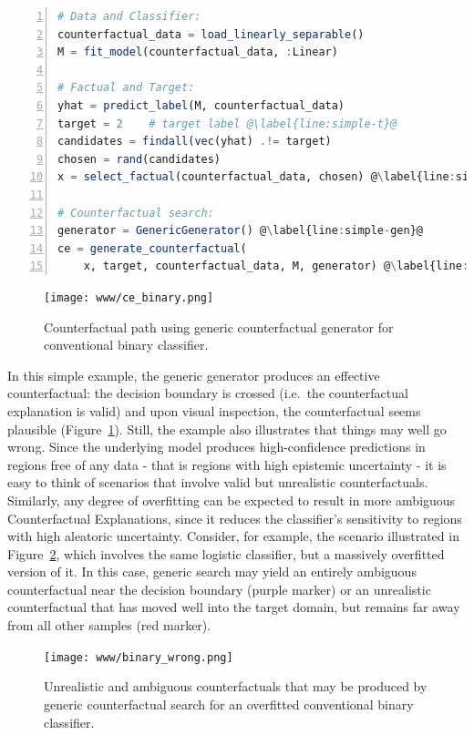 \documentclass{juliacon}
\begin{document}
\begin{lstlisting}[language=Julia, escapechar=@, numbers=left, label={lst:simple}, caption={}] 
# Data and Classifier:
counterfactual_data = load_linearly_separable()
M = fit_model(counterfactual_data, :Linear)

# Factual and Target:
yhat = predict_label(M, counterfactual_data)
target = 2    # target label @\label{line:simple-t}@
candidates = findall(vec(yhat) .!= target)
chosen = rand(candidates)
x = select_factual(counterfactual_data, chosen) @\label{line:simple-x}@

# Counterfactual search:
generator = GenericGenerator() @\label{line:simple-gen}@
ce = generate_counterfactual(
    x, target, counterfactual_data, M, generator) @\label{line:simple-search}@
\end{lstlisting}

\begin{figure}

{\centering \texttt{[image: www/ce\_binary.png]}

}

\caption{\label{fig-binary}Counterfactual path using generic
counterfactual generator for conventional binary classifier.}

\end{figure}

In this simple example, the generic generator produces an effective
counterfactual: the decision boundary is crossed (i.e.~the
counterfactual explanation is valid) and upon visual inspection, the
counterfactual seems plausible (Figure~\ref{fig-binary}). Still, the
example also illustrates that things may well go wrong. Since the
underlying model produces high-confidence predictions in regions free of
any data - that is regions with high epistemic uncertainty - it is easy
to think of scenarios that involve valid but unrealistic
counterfactuals. Similarly, any degree of overfitting can be expected to
result in more ambiguous Counterfactual Explanations, since it reduces
the classifier's sensitivity to regions with high aleatoric uncertainty.
Consider, for example, the scenario illustrated in
Figure~\ref{fig-binary-wrong}, which involves the same logistic
classifier, but a massively overfitted version of it. In this case,
generic search may yield an entirely ambiguous counterfactual near the
decision boundary (purple marker) or an unrealistic counterfactual that
has moved well into the target domain, but remains far away from all
other samples (red marker).

\begin{figure}

{\centering \texttt{[image: www/binary\_wrong.png]}

}

\caption{\label{fig-binary-wrong}Unrealistic and ambiguous
counterfactuals that may be produced by generic counterfactual search
for an overfitted conventional binary classifier.}

\end{figure}
\end{document}
